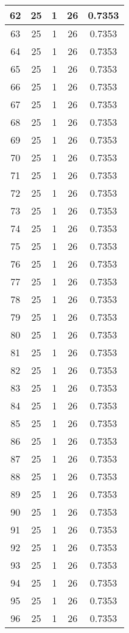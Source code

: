 \documentclass[letterpaper, 12pt]{article}
\begin{document}
\begin{longtable}{|c|c|c|c|c|}
\hline
62 & 25 & 1 & 26 & 0.7353 \\
\hline
63 & 25 & 1 & 26 & 0.7353 \\
\hline
64 & 25 & 1 & 26 & 0.7353 \\
\hline
65 & 25 & 1 & 26 & 0.7353 \\
\hline
66 & 25 & 1 & 26 & 0.7353 \\
\hline
67 & 25 & 1 & 26 & 0.7353 \\
\hline
68 & 25 & 1 & 26 & 0.7353 \\
\hline
69 & 25 & 1 & 26 & 0.7353 \\
\hline
70 & 25 & 1 & 26 & 0.7353 \\
\hline
71 & 25 & 1 & 26 & 0.7353 \\
\hline
72 & 25 & 1 & 26 & 0.7353 \\
\hline
73 & 25 & 1 & 26 & 0.7353 \\
\hline
74 & 25 & 1 & 26 & 0.7353 \\
\hline
75 & 25 & 1 & 26 & 0.7353 \\
\hline
76 & 25 & 1 & 26 & 0.7353 \\
\hline
77 & 25 & 1 & 26 & 0.7353 \\
\hline
78 & 25 & 1 & 26 & 0.7353 \\
\hline
79 & 25 & 1 & 26 & 0.7353 \\
\hline
80 & 25 & 1 & 26 & 0.7353 \\
\hline
81 & 25 & 1 & 26 & 0.7353 \\
\hline
82 & 25 & 1 & 26 & 0.7353 \\
\hline
83 & 25 & 1 & 26 & 0.7353 \\
\hline
84 & 25 & 1 & 26 & 0.7353 \\
\hline
85 & 25 & 1 & 26 & 0.7353 \\
\hline
86 & 25 & 1 & 26 & 0.7353 \\
\hline
87 & 25 & 1 & 26 & 0.7353 \\
\hline
88 & 25 & 1 & 26 & 0.7353 \\
\hline
89 & 25 & 1 & 26 & 0.7353 \\
\hline
90 & 25 & 1 & 26 & 0.7353 \\
\hline
91 & 25 & 1 & 26 & 0.7353 \\
\hline
92 & 25 & 1 & 26 & 0.7353 \\
\hline
93 & 25 & 1 & 26 & 0.7353 \\
\hline
94 & 25 & 1 & 26 & 0.7353 \\
\hline
95 & 25 & 1 & 26 & 0.7353 \\
\hline
96 & 25 & 1 & 26 & 0.7353 \\

\end{longtable}
\end{document}
